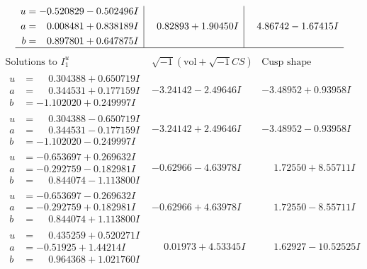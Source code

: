 \documentclass[1p]{elsarticle_modified}
\theoremstyle{definition}
\newcommand{\I}{\sqrt{-1}}
\begin{document}
$$\begin{array}{c|c|c}
\begin{aligned}
u &= -0.520829 - 0.502496 I \\
a &= \phantom{-}0.008481 + 0.838189 I \\
b &= \phantom{-}0.897801 + 0.647875 I\end{aligned}
 & \phantom{-}0.82893 + 1.90450 I & \phantom{-}4.86742 - 1.67415 I\\
 \hline 
 \end{array}$$\newpage$$\begin{array}{c|c|c}  
\text{Solutions to }I^u_{1}& \I (\text{vol} + \sqrt{-1}CS) & \text{Cusp shape}\\
 \hline 
\begin{aligned}
u &= \phantom{-}0.304388 + 0.650719 I \\
a &= \phantom{-}0.344531 + 0.177159 I \\
b &= -1.102020 + 0.249997 I\end{aligned}
 & -3.24142 - 2.49646 I & -3.48952 + 0.93958 I \\ \hline\begin{aligned}
u &= \phantom{-}0.304388 - 0.650719 I \\
a &= \phantom{-}0.344531 - 0.177159 I \\
b &= -1.102020 - 0.249997 I\end{aligned}
 & -3.24142 + 2.49646 I & -3.48952 - 0.93958 I \\ \hline\begin{aligned}
u &= -0.653697 + 0.269632 I \\
a &= -0.292759 - 0.182981 I \\
b &= \phantom{-}0.844074 - 1.113800 I\end{aligned}
 & -0.62966 - 4.63978 I & \phantom{-}1.72550 + 8.55711 I \\ \hline\begin{aligned}
u &= -0.653697 - 0.269632 I \\
a &= -0.292759 + 0.182981 I \\
b &= \phantom{-}0.844074 + 1.113800 I\end{aligned}
 & -0.62966 + 4.63978 I & \phantom{-}1.72550 - 8.55711 I \\ \hline\begin{aligned}
u &= \phantom{-}0.435259 + 0.520271 I \\
a &= -0.51925 + 1.44214 I \\
b &= \phantom{-}0.964368 + 1.021760 I\end{aligned}
 & \phantom{-}0.01973 + 4.53345 I & \phantom{-}1.62927 - 10.52525 I \\ \hline\begin{aligned}

\end{aligned}
\end{array}$$
\end{document}

